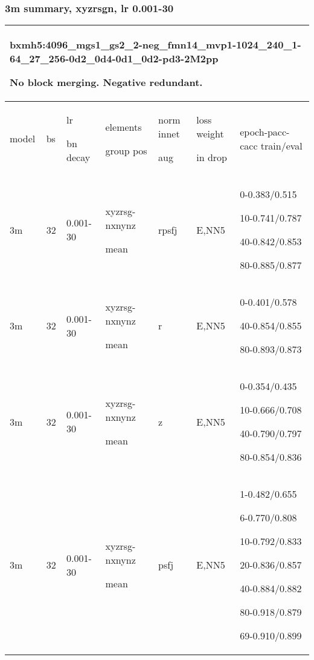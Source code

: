 \documentclass[,table,dvipsnames]{article}
\begin{document}
\subsubsection{3m summary, xyzrsgn, lr 0.001-30}
\begin{tabular}{|p{1.5cm}|p{1cm}|p{2cm}|p{1.5cm}|p{1.5cm}|p{1.5cm}|p{5cm}| }
	\hline
	\multicolumn{7}{|p{14cm}|}{bxmh5:4096\_mgs1\_gs2\_2-neg\_fmn14\_mvp1-1024\_240\_1-64\_27\_256-0d2\_0d4-0d1\_0d2-pd3-2M2pp\par 
		No block merging. Negative redundant. }\\
	\hline
	
	model & bs& lr\par bn decay & elements\par group pos & norm innet\par aug & loss weight\par in drop & epoch-pacc-cacc train/eval \\
	\hline\hline
	
	\rowcolor{yellow!20}
	3m & 32 & 0.001-30 & xyzrsg-nxnynz\par mean& rpsfj & E,NN5 &0-0.383/0.515\par 10-0.741/0.787\par 40-0.842/0.853 \par 80-0.885/0.877\par \\
	
	\rowcolor{green!20}
	3m & 32 & 0.001-30 & xyzrsg-nxnynz\par mean& r & E,NN5& 0-0.401/0.578\par 40-0.854/0.855\par 80-0.893/0.873\\
	
	\rowcolor{orange!20}
	3m & 32 & 0.001-30 & xyzrsg-nxnynz\par mean& z & E,NN5& 0-0.354/0.435\par 10-0.666/0.708\par 40-0.790/0.797\par 80-0.854/0.836\\
	
	\rowcolor{yellow}
	3m & 32 & 0.001-30 & xyzrsg-nxnynz\par mean& psfj & E,NN5& 1-0.482/0.655\par 6-0.770/0.808\par 10-0.792/0.833\par 20-0.836/0.857\par 40-0.884/0.882\par 80-0.918/0.879\par 69-0.910/0.899\\
	
	\hline	
\end{tabular}
\end{document}
